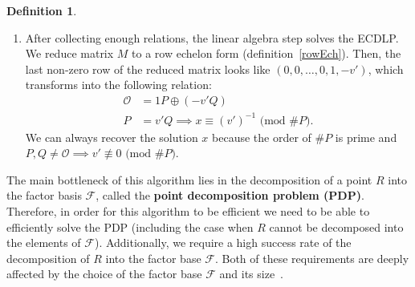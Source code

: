 \documentclass[thesis=M,english]{FITthesis}[2012/10/20]
\theoremstyle{remark}
\theoremstyle{definition}
\newtheorem{DF}{Definition}[section]
\begin{document}
\begin{DF}
\begin{enumerate}
\item After collecting enough relations, the linear algebra step solves the ECDLP. We reduce matrix $M$ to a row echelon form (definition~\ref{rowEch}). Then, the last non-zero row of the reduced matrix looks like $(0,0,\ldots, 0, 1, -v')$, which transforms into the following relation:
\begin{align*}
\mathcal{O}  &= 1P \oplus (-v'Q) \\
P &= v'Q \implies x \equiv (v')^{-1} \text{ (mod $\#P$)}.
\end{align*}
We can always recover the solution $x$ because the order of $\#P$ is prime and $P,Q \neq \mathcal{O} \implies v' \not\equiv 0 \text{ (mod $\#P$)}$.
\end{enumerate}
\end{DF}
\noindent The main bottleneck of this algorithm lies in the decomposition of a point $R$ into the factor basis $\mathcal{F}$, called the \textbf{point decomposition problem (PDP)}. Therefore, in order for this algorithm to be efficient we need to be able to efficiently solve the PDP (including the case when $R$ cannot be decomposed into the elements of $\mathcal{F}$). Additionally, we require a high success rate of the decomposition of $R$ into the factor base $\mathcal{F}$. Both of these requirements are deeply affected by the choice of the factor base $\mathcal{F}$ and its size~\cite{amadori17}. \\ 
\end{document}
